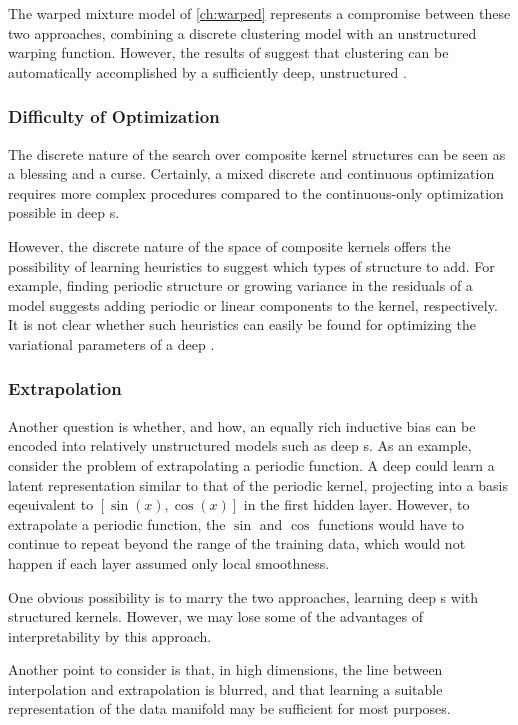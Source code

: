 The warped mixture model of \cref{ch:warped} represents a compromise between these two approaches, combining a discrete clustering model with an unstructured warping function.
However, the results of \citep{damianou2012deep} suggest that clustering can be automatically accomplished by a sufficiently deep, unstructured \gp{}.

\subsubsection{Difficulty of Optimization}
The discrete nature of the search over composite kernel structures can be seen as a blessing and a curse.
Certainly, a mixed discrete and continuous optimization requires more complex procedures compared to the continuous-only optimization possible in deep \gp{}s.

However, the discrete nature of the space of composite kernels offers the possibility of learning heuristics to suggest which types of structure to add.
For example, finding periodic structure or growing variance in the residuals of a model suggests adding periodic or linear components to the kernel, respectively.
It is not clear whether such heuristics can easily be found for optimizing the variational parameters of a deep \gp{}.

\subsubsection{Extrapolation}
Another question is whether, and how, an equally rich inductive bias can be encoded into relatively unstructured models such as deep \gp{}s.
As an example, consider the problem of extrapolating a periodic function.
A deep \gp{} could learn a latent representation similar to that of the periodic kernel, projecting into a basis eqeuivalent to $[\sin(x), \cos(x)]$ in the first hidden layer.
However, to extrapolate a periodic function, the $\sin$ and $\cos$ functions would have to continue to repeat beyond the range of the training data, which would not happen if each layer assumed only local smoothness.

One obvious possibility is to marry the two approaches, learning deep \gp{}s with structured kernels.
However, we may lose some of the advantages of interpretability by this approach.

Another point to consider is that, in high dimensions, the line between interpolation and extrapolation is blurred, and that learning a suitable representation of the data manifold may be sufficient for most purposes.

